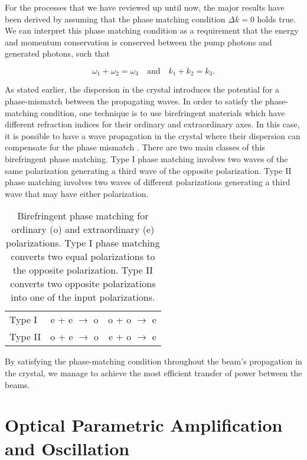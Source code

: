 For the processes that we have reviewed up until now, the major results have been derived by assuming that the phase matching condition $\Delta k = 0$ holds true.  We can interpret this phase matching condition as a requirement that the energy and momentum conservation is conserved between the pump photons and generated photons, such that
 
\begin{equation}
  \label{eq:phase_matching_condition} 
  \omega_1 + \omega_2 = \omega_3  \quad \text{and} \quad k_1 + k_2 = k_3  .
\end{equation}
  

As stated earlier, the dispersion in the crystal introduces the potential for a phase-mismatch
between the propagating waves.  In order to satisfy the phase-matching
condition, one technique is to use birefringent materials which have different refraction indices for their ordinary and extraordinary axes.  In this case, it is possible to have a wave propagation in the crystal where their dispersion can compensate for the phase mismatch \cite{BourzeixPhD}.  There are two main classes of this birefringent phase matching.  Type I phase matching involves two waves of the same polarization generating a third wave of the opposite polarization.  Type II phase matching involves two waves of different polarizations generating a third wave that may have either polarization.

\begin{table}[ht]
  \centering
  \begin{tabular}{|l | c |r |}
    \hline
    Type I & e + e $\rightarrow$  o & o + o $\rightarrow$ e \\
    Type II & o + e $\rightarrow$  o & e + o $\rightarrow$  e\\
    \hline
  \end{tabular}
\caption{Birefringent phase matching for ordinary (o) and extraordinary (e) polarizations. Type I phase matching converts two equal polarizations to the opposite polarization.  Type II converts two opposite polarizations into one of the input polarizations.}
\label{pm_types}
\end{table}
 
\noindent
By satisfying the phase-matching condition throughout the beam's propagation in
the crystal, we manage to achieve the most efficient transfer of power between
the beams.

\section{Optical Parametric Amplification and Oscillation}
\label{optical_parametric_amplification_and_oscillation} 


